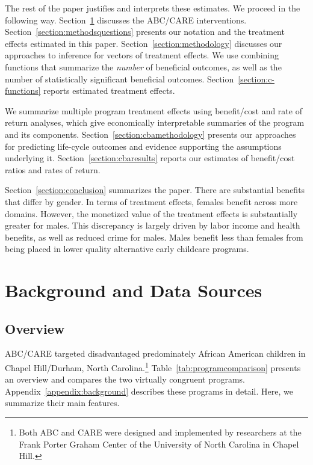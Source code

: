 The rest of the paper justifies and interprets these estimates. We proceed in the following way. Section~\ref{section:background} discusses the ABC/CARE interventions. Section~\ref{section:methodsquestions} presents our notation and the treatment effects estimated in this paper. Section~\ref{section:methodology} discusses our approaches to inference for vectors of treatment effects. We use combining functions that summarize the \emph{number} of beneficial outcomes, as well as the number of statistically significant beneficial outcomes. Section~\ref{section:c-functions} reports estimated treatment effects.

We summarize multiple program treatment effects using benefit/cost and rate of return analyses, which give economically interpretable summaries of the program and its components. Section~\ref{section:cbamethodology} presents our approaches for predicting life-cycle outcomes and evidence supporting the assumptions underlying it. Section~\ref{section:cbaresults} reports our estimates of benefit/cost ratios and rates of return.

Section~\ref{section:conclusion} summarizes the paper. There are substantial benefits that differ by gender. In terms of treatment effects, females benefit across more domains. However, the monetized value of the treatment effects is substantially greater for males. This discrepancy is largely driven by labor income and health benefits, as well as reduced crime for males. Males benefit less than females from being placed in lower quality alternative early childcare programs.

\section[Background and Data Sources]{Background and Data Sources} \label{section:background}

\subsection{Overview}

ABC/CARE targeted disadvantaged predominately African American children in Chapel Hill/Durham, North Carolina.\footnote{Both ABC and CARE were designed and implemented by researchers at the Frank Porter Graham Center of the University of North Carolina in Chapel Hill.} Table~\ref{tab:programcomparison} presents an overview and compares the two virtually congruent programs. Appendix~\ref{appendix:background} describes these programs in detail. Here, we summarize their main features.

